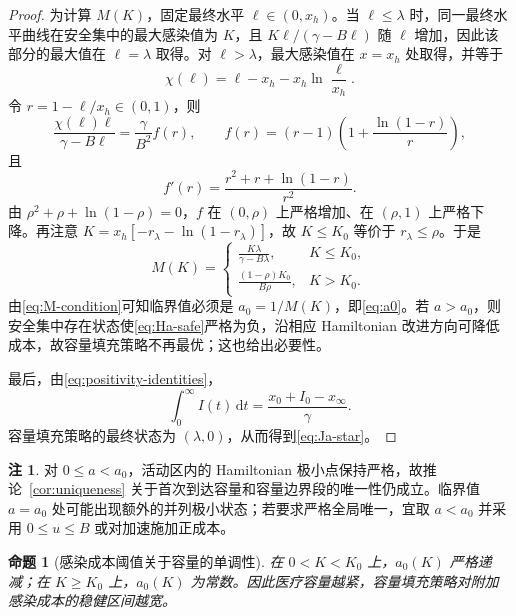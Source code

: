 \documentclass[11pt,a4paper,UTF8]{ctexart}
\newtheorem{proposition}[theorem]{命题}
\theoremstyle{definition}
\newtheorem{remark}[theorem]{注}
\newcommand{\dd}{\,\mathrm{d}}
\begin{document}
\begin{proof}
为计算 $M(K)$，固定最终水平 $\ell\in(0,x_h)$。当 $\ell\le\lambda$ 时，同一最终水平曲线在安全集中的最大感染值为 $K$，且
$K\ell/(\gamma-B\ell)$ 随 $\ell$ 增加，因此该部分的最大值在 $\ell=\lambda$ 取得。对 $\ell>\lambda$，最大感染值在 $x=x_h$ 处取得，并等于
\begin{equation}
\chi(\ell)=\ell-x_h-x_h\ln\frac{\ell}{x_h}.
\label{eq:chi-ell}
\end{equation}
令 $r=1-\ell/x_h\in(0,1)$，则
\begin{equation}
\frac{\chi(\ell)\ell}{\gamma-B\ell}
=\frac{\gamma}{B^2}f(r),
\qquad
f(r)=(r-1)\left(1+\frac{\ln(1-r)}r\right),
\label{eq:F-r-infection}
\end{equation}
且
\begin{equation}
f'(r)=\frac{r^2+r+\ln(1-r)}{r^2}.
\label{eq:fprime-infection}
\end{equation}
由 $\rho^2+\rho+\ln(1-\rho)=0$，$f$ 在 $(0,\rho)$ 上严格增加、在 $(\rho,1)$ 上严格下降。再注意
$K=x_h[-r_\lambda-\ln(1-r_\lambda)]$，故 $K\le K_0$ 等价于 $r_\lambda\le\rho$。于是
\begin{equation}
M(K)=
\begin{cases}
\displaystyle\frac{K\lambda}{\gamma-B\lambda}, & K\le K_0,\\[3mm]
\displaystyle\frac{(1-\rho)K_0}{B\rho}, & K>K_0.
\end{cases}
\label{eq:M-explicit}
\end{equation}
由\eqref{eq:M-condition}可知临界值必须是 $a_0=1/M(K)$，即\eqref{eq:a0}。若 $a>a_0$，则安全集中存在状态使\eqref{eq:Ha-safe}严格为负，沿相应 Hamiltonian 改进方向可降低成本，故容量填充策略不再最优；这也给出必要性。

最后，由\eqref{eq:positivity-identities}，
\[
\int_0^\infty I(t)\dd t
=\frac{x_0+I_0-x_\infty}{\gamma}.
\]
容量填充策略的最终状态为 $(\lambda,0)$，从而得到\eqref{eq:Ja-star}。
\end{proof}

\begin{remark}
对 $0\le a<a_0$，活动区内的 Hamiltonian 极小点保持严格，故推论~\ref{cor:uniqueness} 关于首次到达容量和容量边界段的唯一性仍成立。临界值 $a=a_0$ 处可能出现额外的并列极小状态；若要求严格全局唯一，宜取 $a<a_0$ 并采用 $0\le u\le B$ 或对加速施加正成本。
\end{remark}

\begin{proposition}[感染成本阈值关于容量的单调性]
在 $0<K<K_0$ 上，$a_0(K)$ 严格递减；在 $K\ge K_0$ 上，$a_0(K)$ 为常数。因此医疗容量越紧，容量填充策略对附加感染成本的稳健区间越宽。
\end{proposition}
\end{document}
